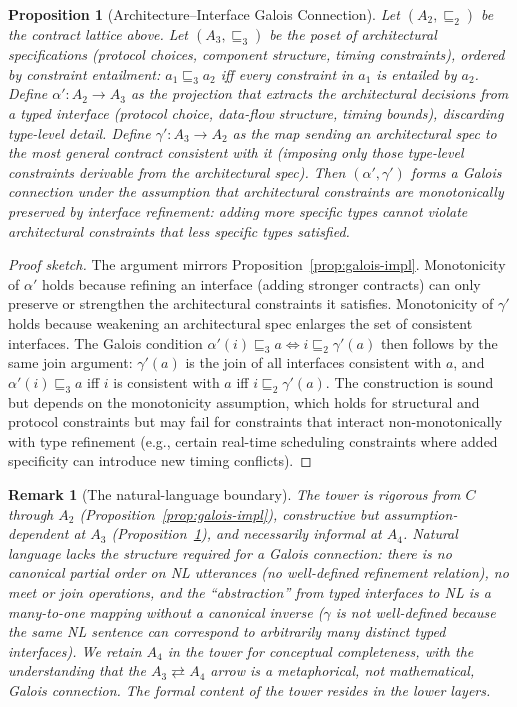 \documentclass[11pt, a4paper]{googledeepmind}
\newtheorem{proposition}{Proposition}[section]
\newtheorem*{remark}{Remark}
\begin{document}
\begin{proposition}[Architecture--Interface Galois Connection]
\label{prop:galois-arch}
Let $(A_2, \sqsubseteq_2)$ be the contract lattice above. Let $(A_3, \sqsubseteq_3)$ be the poset of architectural specifications (protocol choices, component structure, timing constraints), ordered by constraint entailment: $a_1 \sqsubseteq_3 a_2$ iff every constraint in $a_1$ is entailed by $a_2$. Define $\alpha': A_2 \to A_3$ as the projection that extracts the architectural decisions from a typed interface (protocol choice, data-flow structure, timing bounds), discarding type-level detail. Define $\gamma': A_3 \to A_2$ as the map sending an architectural spec to the most general contract consistent with it (imposing only those type-level constraints derivable from the architectural spec). Then $(\alpha', \gamma')$ forms a Galois connection under the assumption that architectural constraints are monotonically preserved by interface refinement: adding more specific types cannot violate architectural constraints that less specific types satisfied.
\end{proposition}

\begin{proof}[Proof sketch]
The argument mirrors Proposition~\ref{prop:galois-impl}. Monotonicity of $\alpha'$ holds because refining an interface (adding stronger contracts) can only preserve or strengthen the architectural constraints it satisfies. Monotonicity of $\gamma'$ holds because weakening an architectural spec enlarges the set of consistent interfaces. The Galois condition $\alpha'(i) \sqsubseteq_3 a \iff i \sqsubseteq_2 \gamma'(a)$ then follows by the same join argument: $\gamma'(a)$ is the join of all interfaces consistent with $a$, and $\alpha'(i) \sqsubseteq_3 a$ iff $i$ is consistent with $a$ iff $i \sqsubseteq_2 \gamma'(a)$. The construction is sound but depends on the monotonicity assumption, which holds for structural and protocol constraints but may fail for constraints that interact non-monotonically with type refinement (e.g., certain real-time scheduling constraints where added specificity can introduce new timing conflicts).
\end{proof}

\begin{remark}[The natural-language boundary]
The tower is rigorous from $C$ through $A_2$ (Proposition~\ref{prop:galois-impl}), constructive but assumption-dependent at $A_3$ (Proposition~\ref{prop:galois-arch}), and necessarily informal at $A_4$. Natural language lacks the structure required for a Galois connection: there is no canonical partial order on NL utterances (no well-defined refinement relation), no meet or join operations, and the ``abstraction'' from typed interfaces to NL is a many-to-one mapping without a canonical inverse ($\gamma$ is not well-defined because the same NL sentence can correspond to arbitrarily many distinct typed interfaces). We retain $A_4$ in the tower for conceptual completeness, with the understanding that the $A_3 \rightleftarrows A_4$ arrow is a metaphorical, not mathematical, Galois connection. The formal content of the tower resides in the lower layers.
\end{remark}
\end{document}
